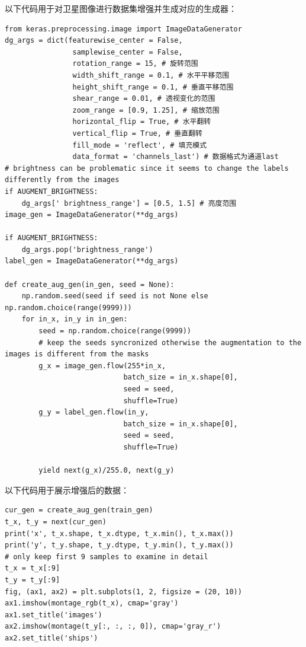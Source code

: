 以下代码用于对卫星图像进行数据集增强并生成对应的生成器：

\begin{verbatim}
from keras.preprocessing.image import ImageDataGenerator
dg_args = dict(featurewise_center = False, 
                samplewise_center = False,
                rotation_range = 15, # 旋转范围
                width_shift_range = 0.1, # 水平平移范围
                height_shift_range = 0.1, # 垂直平移范围
                shear_range = 0.01, # 透视变化的范围
                zoom_range = [0.9, 1.25], # 缩放范围
                horizontal_flip = True, # 水平翻转
                vertical_flip = True, # 垂直翻转
                fill_mode = 'reflect', # 填充模式
                data_format = 'channels_last') # 数据格式为通道last
# brightness can be problematic since it seems to change the labels differently from the images 
if AUGMENT_BRIGHTNESS:
    dg_args[' brightness_range'] = [0.5, 1.5] # 亮度范围
image_gen = ImageDataGenerator(**dg_args)

if AUGMENT_BRIGHTNESS:
    dg_args.pop('brightness_range')
label_gen = ImageDataGenerator(**dg_args)

def create_aug_gen(in_gen, seed = None):
    np.random.seed(seed if seed is not None else np.random.choice(range(9999)))
    for in_x, in_y in in_gen:
        seed = np.random.choice(range(9999))
        # keep the seeds syncronized otherwise the augmentation to the images is different from the masks
        g_x = image_gen.flow(255*in_x, 
                            batch_size = in_x.shape[0], 
                            seed = seed, 
                            shuffle=True)
        g_y = label_gen.flow(in_y, 
                            batch_size = in_x.shape[0], 
                            seed = seed, 
                            shuffle=True)

        yield next(g_x)/255.0, next(g_y)
\end{verbatim}

以下代码用于展示增强后的数据：

\begin{verbatim}
cur_gen = create_aug_gen(train_gen)
t_x, t_y = next(cur_gen)
print('x', t_x.shape, t_x.dtype, t_x.min(), t_x.max())
print('y', t_y.shape, t_y.dtype, t_y.min(), t_y.max())
# only keep first 9 samples to examine in detail
t_x = t_x[:9]
t_y = t_y[:9]
fig, (ax1, ax2) = plt.subplots(1, 2, figsize = (20, 10))
ax1.imshow(montage_rgb(t_x), cmap='gray')
ax1.set_title('images')
ax2.imshow(montage(t_y[:, :, :, 0]), cmap='gray_r')
ax2.set_title('ships')
\end{verbatim}

